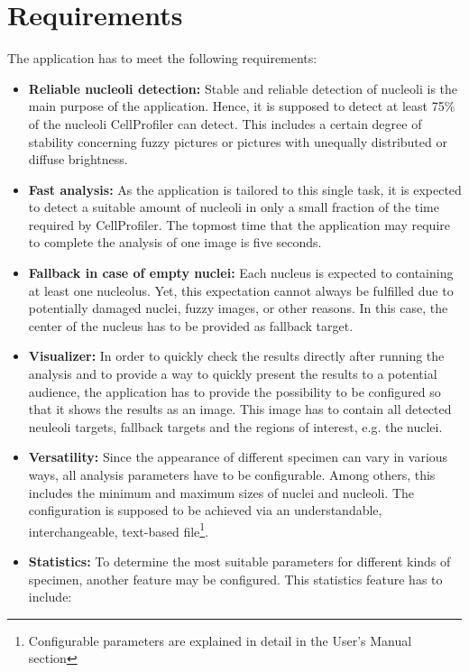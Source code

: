 \documentclass[a4paper, 12pt]{article}
\begin{document}
\section{Requirements}\label{sec:requirements}
The application has to meet the following requirements:
\begin{itemize}
  \item \textbf{Reliable nucleoli detection:} Stable and reliable detection of
  nucleoli is the main purpose of the application. Hence, it is supposed to
  detect at least 75\% of the nucleoli CellProfiler can detect. This includes
  a certain degree of stability concerning fuzzy pictures or pictures with
  unequally distributed or diffuse brightness.
  \item \textbf{Fast analysis:} As the application is tailored to this single
  task, it is expected to detect a suitable amount of nucleoli in only a small
  fraction of the time required by CellProfiler. The topmost time that the
  application may require to complete the analysis of one image is five seconds.
  \item \textbf{Fallback in case of empty nuclei:} Each nucleus is expected to
  containing at least one nucleolus. Yet, this expectation cannot always be
  fulfilled due to potentially damaged nuclei, fuzzy images, or other reasons.
  In this case, the center of the nucleus has to be provided as fallback target.
  \item \textbf{Visualizer:} In order to quickly check the results directly
  after running the analysis and to provide a way to quickly present the results
  to a potential audience, the application has to provide the possibility to be
  configured so that it shows the results as an image. This image has to contain
  all detected neuleoli targets, fallback targets and the regions of interest,
  e.g. the nuclei.
  \item \textbf{Versatility:} Since the appearance of different specimen can
  vary in various ways, all analysis parameters have to be configurable. Among
  others, this includes the minimum and maximum sizes of nuclei and nucleoli.
  The configuration is supposed to be achieved via an understandable,
  interchangeable, text-based file\footnote{Configurable parameters are
  explained in detail in the User's Manual section}.
  \item \textbf{Statistics:} To determine the most suitable parameters for
  different kinds of specimen, another feature may be configured. This
  statistics feature has to include:
  \begin{itemize}

\end{itemize}
\end{itemize}
\end{document}
